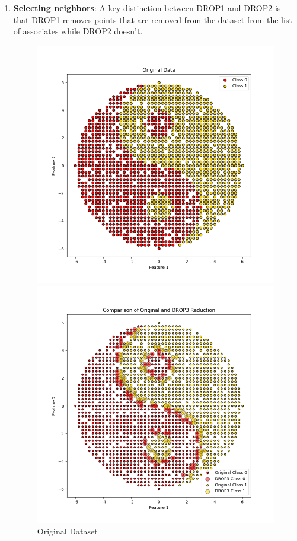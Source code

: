 \begin{enumerate}
	\item \textbf{Selecting neighbors}: A key distinction between DROP1 and DROP2 is that DROP1 removes points that are removed from the dataset from the list of associates while DROP2 doesn't.
	
	\begin{figure}[ht]
		\centering
		\begin{minipage}{0.45\textwidth}
			\centering
			\includegraphics[width=\textwidth]{figures/2dDataset} %
			\caption{Original Dataset}
			\label{fig:2dDataset2}
		\end{minipage}\hfill
		\begin{minipage}{0.45\textwidth}
			\centering
			\includegraphics[width=\textwidth]{figures/DROP3} %

\end{minipage}
\end{figure}
\end{enumerate}
